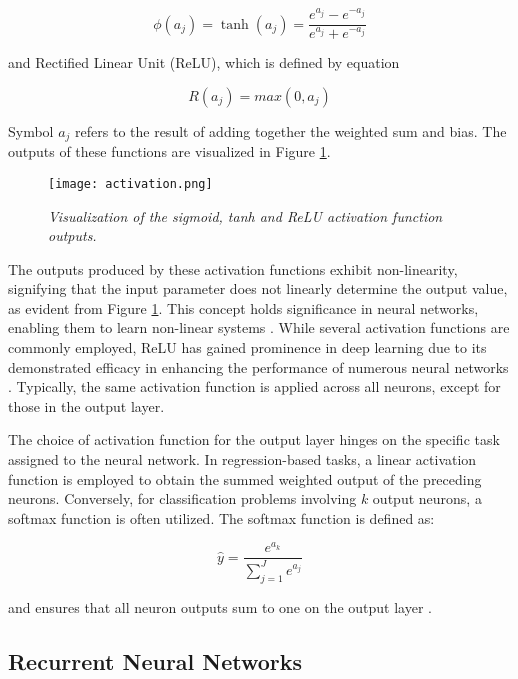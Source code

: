 \begin{equation}
    \phi(a_j) = \tanh(a_j) = \frac{e^{a_j} - e^{-a_j}}{e^{a_j} + e^{-a_j}}
\end{equation}

and Rectified Linear Unit (ReLU), which is defined by equation

\begin{equation}
    R(a_j) = max(0, a_j)
\end{equation}

Symbol \(a_j\) refers to the result of adding together the weighted sum and bias. The
outputs of these functions are visualized in Figure \ref{fig:activation}.


\begin{figure}[H]
    \centering
    \texttt{[image: activation.png]}
    \caption{
        \it{Visualization of the sigmoid, tanh and ReLU activation function outputs.}
    }
    \label{fig:activation}
\end{figure}

The outputs produced by these activation functions exhibit non-linearity, signifying that the input parameter does not linearly determine the output value, as evident from Figure \ref{fig:activation}. This concept holds significance in neural networks, enabling them to learn non-linear systems \cite{doi:10.1080/00207179008934126}. While several activation functions are commonly employed, ReLU has gained prominence in deep learning due to its demonstrated efficacy in enhancing the performance of numerous neural networks \cite{lipton2015critical}. Typically, the same activation function is applied across all neurons, except for those in the output layer.

The choice of activation function for the output layer hinges on the specific task assigned to the neural network. In regression-based tasks, a linear activation function is employed to obtain the summed weighted output of the preceding neurons. Conversely, for classification problems involving \(k\) output neurons, a softmax function is often utilized. The softmax function is defined as:

\begin{equation}
    \hat{y} = \frac{e^{a_k}}{\sum_{j=1}^J e^{a_j}}
\end{equation}

\noindent and ensures that all neuron outputs sum to one on the output layer \cite{lipton2015critical}.

\subsection{Recurrent Neural Networks}
\label{sec:rnn}

